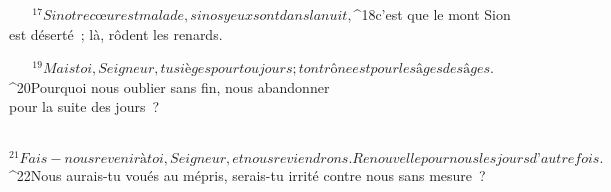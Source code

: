            
         
        ${}^{17}Si notre cœur est malade,
        si nos yeux sont dans la nuit,
        
           
         
        ${}^{18}c’est que le mont Sion est déserté ;
        là, rôdent les renards.
        
           
         
        ${}^{19}Mais toi, Seigneur, tu sièges pour toujours ;
        ton trône est pour les âges des âges.
        
           
         
        ${}^{20}Pourquoi nous oublier sans fin,
        nous abandonner\\pour la suite des jours ?
        
           
         
        ${}^{21}Fais-nous revenir à toi, Seigneur, et nous reviendrons.
        Renouvelle pour nous les jours d’autrefois.
        
           
         
${}^{22}Nous aurais-tu voués au mépris,
        serais-tu irrité contre nous sans mesure ?
        
           
